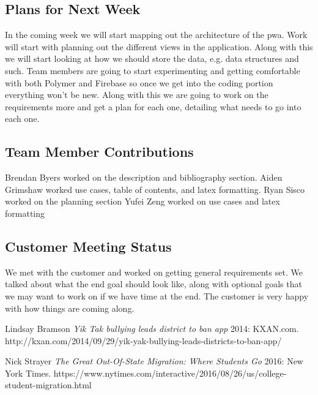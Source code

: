 \documentclass[12pt]{article}
\begin{document}
\subsection{Plans for Next Week}
	In the coming week we will start mapping out the architecture of the pwa.  Work will start with planning out the different views in the application.  Along with this we will start looking at how we should store the data, e.g. data structures and such.  Team members are going to start experimenting and getting comfortable with both Polymer and Firebase so once we get into the coding portion everything won’t be new.  Along with this we are going to work on the requirements more and get a plan for each one, detailing what needs to go into each one.
\subsection{Team Member Contributions}
	Brendan Byers worked on the description and bibliography section.
	Aiden Grimshaw worked use cases, table of contents, and latex formatting.
	Ryan Sisco worked on the planning section
	Yufei Zeng worked on use cases and latex formatting

\subsection{Customer Meeting Status}
	We met with the customer and worked on getting general requirements set.  We talked about what the end goal should look like, along with optional goals that we may want to work on if we have time at the end.  The customer is very happy with how things are coming along.

\newpage
  
  

  \begin{thebibliography}{1}

   Lindsay Bramson {\em Yik Tak bullying leads district to ban app}  2014: KXAN.com. http://kxan.com/2014/09/29/yik-yak-bullying-leads-districts-to-ban-app/

    Nick Strayer {\em The Great Out-Of-State Migration: Where Students Go} 2016:
  New York Times. https://www.nytimes.com/interactive/2016/08/26/us/college-student-migration.html

  \end{thebibliography}
\end{document}
